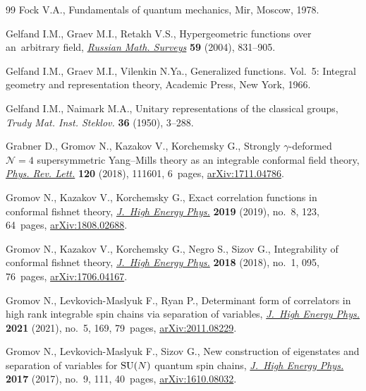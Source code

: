 \documentclass[pdftex]{sigma}
\numberwithin{equation}{section}
\begin{document}
\begin{thebibliography}{99}
Fock V.A., Fundamentals of quantum mechanics, Mir, Moscow, 1978.

Gelfand I.M., Graev M.I., Retakh V.S., Hypergeometric functions over
 an~arbitrary field,
 \href{https://doi.org/10.1070/RM2004v059n05ABEH000771}{\textit{Russian Math.
 Surveys}} \textbf{59} (2004), 831--905.

Gelfand I.M., Graev M.I., Vilenkin N.Ya., Generalized functions. {V}ol.~5:
 {I}ntegral geometry and representation theory, Academic Press, New York,
 1966.

Gelfand I.M., Naimark M.A., Unitary representations of the classical groups,
 \textit{Trudy Mat. Inst. Steklov.} \textbf{36} (1950), 3--288.

Grabner D., Gromov N., Kazakov V., Korchemsky G., Strongly {$\gamma$}-deformed
 {$\mathcal{N}=4$} supersymmetric {Y}ang--{M}ills theory as an integrable
 conformal field theory,
 \href{https://doi.org/10.1103/PhysRevLett.120.111601}{\textit{Phys. Rev.
 Lett.}} \textbf{120} (2018), 111601, 6~pages,
 \href{http://arxiv.org/abs/1711.04786}{arXiv:1711.04786}.

Gromov N., Kazakov V., Korchemsky G., Exact correlation functions in conformal
 fishnet theory,
 \href{https://doi.org/10.1007/jhep08(2019)123}{\textit{J.~High Energy Phys.}}
 \textbf{2019} (2019), no.~8, 123, 64~pages,
 \href{http://arxiv.org/abs/1808.02688}{arXiv:1808.02688}.

Gromov N., Kazakov V., Korchemsky G., Negro S., Sizov G., Integrability of
 conformal fishnet theory,
 \href{https://doi.org/10.1007/jhep01(2018)095}{\textit{J.~High Energy Phys.}}
 \textbf{2018} (2018), no.~1, 095, 76~pages,
 \href{http://arxiv.org/abs/1706.04167}{arXiv:1706.04167}.

Gromov N., Levkovich-Maslyuk F., Ryan P., Determinant form of correlators in
 high rank integrable spin chains via separation of variables,
 \href{https://doi.org/10.1007/jhep05(2021)169}{\textit{J.~High Energy Phys.}}
 \textbf{2021} (2021), no.~5, 169, 79~pages,
 \href{http://arxiv.org/abs/2011.08229}{arXiv:2011.08229}.

Gromov N., Levkovich-Maslyuk F., Sizov G., New construction of eigenstates and
 separation of variables for {${\rm SU}(N)$} quantum spin chains,
 \href{https://doi.org/10.1007/jhep09(2017)111}{\textit{J.~High Energy Phys.}}
 \textbf{2017} (2017), no.~9, 111, 40~pages,
 \href{http://arxiv.org/abs/1610.08032}{arXiv:1610.08032}.


\end{thebibliography}
\end{document}
